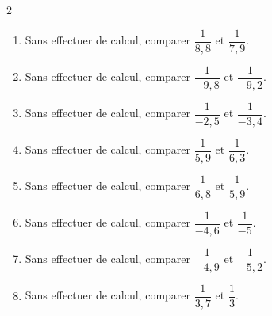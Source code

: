{%
\begin{Exercice}
\leavevmode\vspace{-\baselineskip}
\vspace{-0.5cm}
\begin{multicols}{2}
\begin{enumerate}[itemsep=1.5em]
	\item \begin{minipage}[t]{\linewidth}Sans effectuer de calcul, comparer $\dfrac{1}{8{,}8}$ et $\dfrac{1}{7{,}9}$.\end{minipage}
	\item \begin{minipage}[t]{\linewidth}Sans effectuer de calcul, comparer $\dfrac{1}{-9{,}8}$ et $\dfrac{1}{-9{,}2}$.\end{minipage}
	\item \begin{minipage}[t]{\linewidth}Sans effectuer de calcul, comparer $\dfrac{1}{-2{,}5}$ et $\dfrac{1}{-3{,}4}$.\end{minipage}
	\item \begin{minipage}[t]{\linewidth}Sans effectuer de calcul, comparer $\dfrac{1}{5{,}9}$ et $\dfrac{1}{6{,}3}$.\end{minipage}
	\item \begin{minipage}[t]{\linewidth}Sans effectuer de calcul, comparer $\dfrac{1}{6{,}8}$ et $\dfrac{1}{5{,}9}$.\end{minipage}
	\item \begin{minipage}[t]{\linewidth}Sans effectuer de calcul, comparer $\dfrac{1}{-4{,}6}$ et $\dfrac{1}{-5}$.\end{minipage}
	\item \begin{minipage}[t]{\linewidth}Sans effectuer de calcul, comparer $\dfrac{1}{-4{,}9}$ et $\dfrac{1}{-5{,}2}$.\end{minipage}
	\item \begin{minipage}[t]{\linewidth}Sans effectuer de calcul, comparer $\dfrac{1}{3{,}7}$ et $\dfrac{1}{3}$.\end{minipage}
\end{enumerate}
\end{multicols}
\end{Exercice}

}
